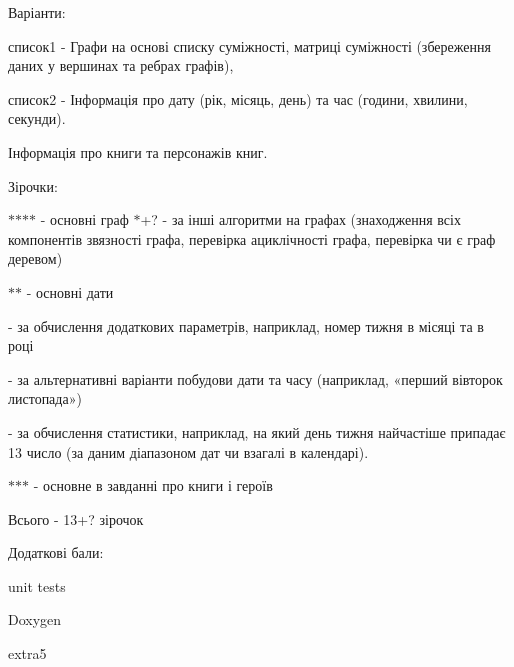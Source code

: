 Варіанти\+:
\begin{DoxyItemize}
\item список1 -\/ Графи на основі списку суміжності, матриці суміжності (збереження даних у вершинах та ребрах графів),
\item список2 -\/ Інформація про дату (рік, місяць, день) та час (години, хвилини, секунди).
\begin{DoxyItemize}
\item Інформація про книги та персонажів книг.
\end{DoxyItemize}
\end{DoxyItemize}

Зірочки\+:

$\ast$$\ast$$\ast$$\ast$ -\/ основні граф $\ast$+? -\/ за інші алгоритми на графах (знаходження всіх компонентів зв\textquotesingle{}язності графа, перевірка ациклічності графа, перевірка чи є граф деревом)

$\ast$$\ast$ -\/ основні дати
\begin{DoxyItemize}
\item -\/ за обчислення додаткових параметрів, наприклад, номер тижня в місяці та в році
\item -\/ за альтернативні варіанти побудови дати та часу (наприклад, «перший вівторок листопада»)
\item -\/ за обчислення статистики, наприклад, на який день тижня найчастіше припадає 13 число (за даним діапазоном дат чи взагалі в календарі).
\end{DoxyItemize}

$\ast$$\ast$$\ast$ -\/ основне в завданні про книги і героїв

Всього -\/ 13+? зірочок

Додаткові бали\+:
\begin{DoxyItemize}
\item unit tests
\item Doxygen
\item extra5 
\end{DoxyItemize}